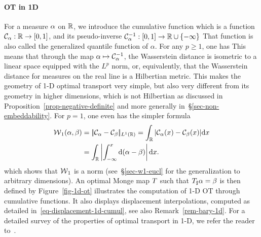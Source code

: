 \paragraph{OT in 1D}

For a measure $\alpha$ on $\mathbb{R}$, we introduce the cumulative function
which is a function $\mathcal{C}_{\alpha} : \mathbb{R} \rightarrow [0,1]$, and its pseudo-inverse  $\mathcal{C}_{\alpha}^{-1} : [0,1] \rightarrow \mathbb{R} \cup \{-\infty\}$ 
%
That function is also called the generalized quantile function of $\alpha$. For any $p \geq 1$, one has
This means that through the map $\alpha \mapsto \mathcal{C}_{\alpha}^{-1}$, the Wasserstein distance is isometric to a linear space equipped with the $L^p$ norm, or, equivalently, that the Wasserstein distance for measures on the real line is a Hilbertian metric. 
This makes the geometry of 1-D optimal transport very simple, but also very different from its geometry in higher dimensions, which is not Hilbertian as discussed in Proposition~\ref{prop-negative-definite} and more generally in~\S\ref{sec-non-embeddability}.
%
For $p=1$, one even has the simpler formula
\begin{align}\label{eq-w1-1d}
	\operatorname{\mathcal{W}}_1(\alpha,\beta) &= |\!|  \mathcal{C}_{\alpha} - \mathcal{C}_{\beta}  |\!|_{L^1(\mathbb{R})} = 
	\int_{\mathbb{R}} | \mathcal{C}_{\alpha}(x) - \mathcal{C}_{\beta}(x) | \mathrm{d} x \\
	&= \int_{\mathbb{R}} \left\lvert \int_{-\infty}^x \mathrm{d}(\alpha-\beta) \right\rvert \mathrm{d} x.
\end{align}
which shows that $\operatorname{\mathcal{W}}_1$ is a norm (see~\S\ref{sec-w1-eucl} for the generalization to arbitrary dimensions). 
%
An optimal Monge map $T$ such that $T_\sharp \alpha=\beta$ is then defined by
Figure~\ref{fig-1d-ot} illustrates the computation of 1-D OT through cumulative functions. It also displays displacement interpolations, computed as detailed in~\eqref{eq-displacement-1d-cumul}, see also Remark~\ref{rem-bary-1d}. For a detailed survey of the properties of optimal transport in 1-D, we refer the reader to~\cite[Chapter 2]{SantambrogioBook}.



